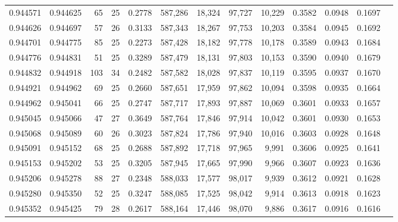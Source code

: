 \begin{tabular}{rrrrrrrrrrrrr}
0.944571 & 0.944625 &    65 &  25 &                                     0.2778 & 587,286 &  18,324 &  97,727 &  10,229 & 0.3582 & 0.0948 & 0.1697 \\
0.944626 & 0.944697 &    57 &  26 &                                     0.3133 & 587,343 &  18,267 &  97,753 &  10,203 & 0.3584 & 0.0945 & 0.1692 \\
0.944701 & 0.944775 &    85 &  25 &                                     0.2273 & 587,428 &  18,182 &  97,778 &  10,178 & 0.3589 & 0.0943 & 0.1684 \\
0.944776 & 0.944831 &    51 &  25 &                                     0.3289 & 587,479 &  18,131 &  97,803 &  10,153 & 0.3590 & 0.0940 & 0.1679 \\
0.944832 & 0.944918 &   103 &  34 &                                     0.2482 & 587,582 &  18,028 &  97,837 &  10,119 & 0.3595 & 0.0937 & 0.1670 \\
0.944921 & 0.944962 &    69 &  25 &                                     0.2660 & 587,651 &  17,959 &  97,862 &  10,094 & 0.3598 & 0.0935 & 0.1664 \\
0.944962 & 0.945041 &    66 &  25 &                                     0.2747 & 587,717 &  17,893 &  97,887 &  10,069 & 0.3601 & 0.0933 & 0.1657 \\
0.945045 & 0.945066 &    47 &  27 &                                     0.3649 & 587,764 &  17,846 &  97,914 &  10,042 & 0.3601 & 0.0930 & 0.1653 \\
0.945068 & 0.945089 &    60 &  26 &                                     0.3023 & 587,824 &  17,786 &  97,940 &  10,016 & 0.3603 & 0.0928 & 0.1648 \\
0.945091 & 0.945152 &    68 &  25 &                                     0.2688 & 587,892 &  17,718 &  97,965 &   9,991 & 0.3606 & 0.0925 & 0.1641 \\
0.945153 & 0.945202 &    53 &  25 &                                     0.3205 & 587,945 &  17,665 &  97,990 &   9,966 & 0.3607 & 0.0923 & 0.1636 \\
0.945206 & 0.945278 &    88 &  27 &                                     0.2348 & 588,033 &  17,577 &  98,017 &   9,939 & 0.3612 & 0.0921 & 0.1628 \\
0.945280 & 0.945350 &    52 &  25 &                                     0.3247 & 588,085 &  17,525 &  98,042 &   9,914 & 0.3613 & 0.0918 & 0.1623 \\
0.945352 & 0.945425 &    79 &  28 &                                     0.2617 & 588,164 &  17,446 &  98,070 &   9,886 & 0.3617 & 0.0916 & 0.1616 \\

\end{tabular}
